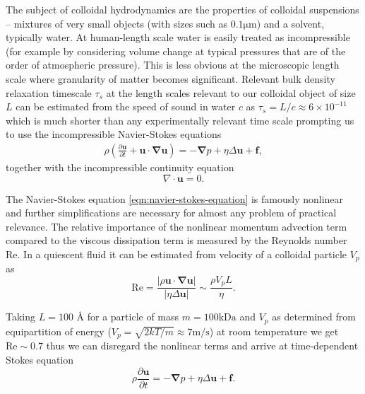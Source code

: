 \documentclass{doctoral}
\newcommand{\pd}{\partial}
\newcommand{\Reynolds}{\mathrm{Re}}
\begin{document}
The subject of colloidal hydrodynamics are the properties of colloidal suspensions -- mixtures of very small objects (with sizes such as $0.1 \mathrm{\mu m}$) and a solvent, typically water.
At human-length scale water is easily treated as incompressible (for example by considering volume change at typical pressures that are of the order of atmospheric pressure).
This is less obvious at the microscopic length scale where granularity of matter becomes significant.
Relevant bulk density relaxation timescale $\tau_s$ at the length scales relevant to our colloidal object of size $L$ can be estimated from the speed of sound in water $c$ as $\tau_s = L/c \approx 6 \times 10^{-11}$ which is much shorter than any experimentally relevant time scale prompting us to use the incompressible Navier-Stokes equations
\begin{eqnarray}
    \rho \left( \frac{\pd \bm{u}}{\pd t} + \bm{u} \cdot \bm{\nabla u} \right) = - \bm{\nabla} p + \eta \Delta \bm{u} + \bm{f}, \label{eqn:navier-stokes-equation}
\end{eqnarray}
together with the incompressible continuity equation
\begin{equation}
    \nabla \cdot \bm{u} = 0 \label{eqn:incompressibility}.
\end{equation}

The Navier-Stokes equation \eqref{eqn:navier-stokes-equation} is famously nonlinear and further simplifications are necessary for almost any problem of practical relevance.
The relative importance of the nonlinear momentum advection term compared to the viscous dissipation term is measured by the Reynolds number $\Reynolds$.
In a quiescent fluid it can be estimated from velocity of a colloidal particle $V_p$ as
\begin{equation}
    \Reynolds = \frac{|\rho \bm{u} \cdot \bm{\nabla}\bm{u}|}{|\eta \Delta \bm{u}|} \sim \frac{\rho V_p L}{\eta}.
    \label{eqn:reynolds-based-estimate}
\end{equation}

Taking $L = 100$ \AA{} for a particle of mass $m = 100 \mathrm{k Da}$ and $V_p$ as determined from equipartition of energy ($V_p = \sqrt{2 k T / m} \approx 7 \mathrm{m/s}$) at room temperature we get $\Reynolds \sim 0.7$ thus we can disregard the nonlinear terms and arrive at time-dependent Stokes equation
\begin{equation}
    \rho \frac{\pd \bm{u}}{\pd t} = - \bm{\nabla} p + \eta \Delta \bm{u} + \bm{f}.
    \label{eqn:time-dependent-stokes-equation}
\end{equation}
\end{document}
